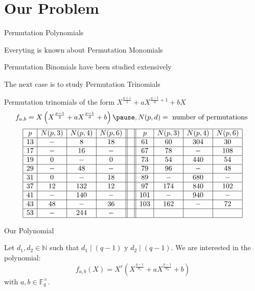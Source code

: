 \documentclass{beamer}
\begin{document}

\section{Our Problem} %
\label{sec:our_problem}


\begin{frame}{Permutation Polynomials}
   \begin{itemize}
      {\large \item Everyting is known about Permutation Monomials
            \vspace{0.7cm}
            \item Permutation Binomials have been studied extensively
            \vspace{0.7cm}
            \item The next case is to study Permutation Trinomials
            \vspace{0.7cm}}
    \end{itemize}
\end{frame}


\begin{frame}{Permutation trinomials of the form $X^{\frac{q+1}{2}}+aX^{\frac{q-1}{d}+1}+bX$}
  $$f_{a,b}=X\left(X^{\frac{p-1}{2}}+aX^{\frac{p-1}{d}}+b\right) \pause,  N(p,d)= \hbox{ number of permutations } $$
\pause
$$\begin{array}{|c|c|c|c||c||c|c|c|c|c|}
\hline
p & N(p,3) & N(p,4) & N(p,6) & & p & N(p,3) & N(p,4) & N(p,6) \\
\hline
13 & - & 8 & 18 & & 61 & 60 & 304 & 30 \\
\hline
17 & - & 16 & - & & 67 & 78 & - & 108 \\
\hline
19 & 0 & - & 0 & & 73 & 54 & 440 & 54 \\
\hline
29 & - & 48 & - & & 79 & 96 & - & 48 \\
\hline
31 & 0 & - & 18 & & 89 & - & 680 & - \\
\hline
37 & 12 & 132 & 12 & & 97 & 174 & 840 & 102\\
\hline
41 & - & 140 & - & & 101 & - & 940 & - \\
\hline
43 & 48 & - & 36 & & 103 & 162 & - & 72\\
\hline
53 & - &244 & - & & & & & \\
\hline
\end{array} $$
  
\end{frame}

\begin{frame}{Our Polynomial}
  

  Let $d_1, d_2 \in \mathbb{N}$ such that $d_1 \mid (q-1)$ y $d_2 \mid (q-1)$. We are interested in the polynomial:
  {\Large$$f_{a,b}(X) = X^r(X^{\frac{q-1}{d_1}} + aX^{\frac{q-1}{d_2}} +b)$$ }
  with $a,b \in \mathbb{F}_q^{\times}$.

\end{frame}
\end{document}
